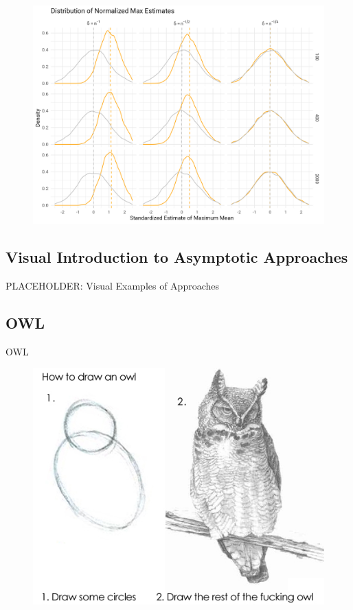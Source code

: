 \documentclass[aspectratio=169, professionalfonts]{beamer}
\begin{document}
\begin{frame}
	\begin{figure}
		\includegraphics[width=.9\textwidth]{figures/max_means_sim_plot}
	\end{figure}
\end{frame}

\subsection{Visual Introduction to Asymptotic Approaches}

\begin{frame}{PLACEHOLDER: Visual Examples of Approaches}
\end{frame}
\subsection{OWL}
\begin{frame}{OWL}
	\begin{figure}
		\includegraphics[width=.6\textwidth]{figures/how-to-draw-an-owl}
	\end{figure}
\end{frame}
\end{document}
